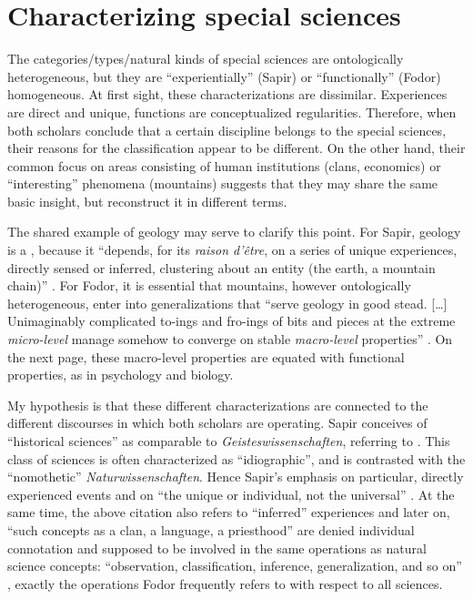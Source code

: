 \documentclass[output=paper]{langscibook}
\begin{document}
\largerpage
\section{Characterizing special sciences}
\label{sec:elffers:characterizing}

 
The categories/types/natural kinds of special sciences are ontologically heterogeneous, but they are  
``experientially'' (Sapir) or ``functionally'' (Fodor) homogeneous. At first sight, these characterizations are dissimilar. Experiences are direct and unique, functions are conceptualized regularities. Therefore, when both scholars conclude that a certain discipline belongs to the special sciences, their reasons for the classification appear to be different. On the other hand, their common focus on areas consisting of human institutions (clans, economics) or ``interesting'' phenomena (mountains) suggests that they may share the same basic insight, but reconstruct it in different terms.
 

The shared example of geology may serve to clarify this point. For Sapir, geology is a , because it ``depends, for its \emph{raison d’être}, on a series of unique experiences, directly sensed or inferred, clustering about an entity (the earth, a mountain chain)'' \citep[445]{Sapir1917}. For Fodor, it is essential that mountains, however ontologically heterogeneous, enter into generalizations that ``serve geology in good stead. […] Unimaginably complicated to-ings and fro-ings of bits and pieces at the extreme \emph{micro-level} manage somehow to converge on stable \emph{macro-level} properties'' \citep[160]{Fodor1997}. On the next page, these macro-level properties are equated with functional properties, as in psychology and biology.

My hypothesis is that these different characterizations are connected to the different discourses in which both scholars are operating. Sapir conceives of ``historical sciences'' as comparable to \emph{Geisteswissenschaften}, referring to \citet{Rickert1913}. This class of sciences is often characterized as ``idiographic'', and is contrasted with the ``nomothetic'' \emph{Naturwissenschaften}. Hence Sapir's emphasis on particular, directly experienced events and on ``the unique or individual, not the universal'' \citep[446]{Sapir1917}. At the same time, the above citation also refers to ``inferred'' experiences and later on, ``such concepts as a clan, a language, a priesthood'' are denied individual connotation and supposed to be involved in the same operations as natural science concepts: ``observation, classification, inference, generalization, and so on'' \citep[446]{Sapir1917}, exactly the operations Fodor frequently refers to with respect to all sciences.
\end{document}
